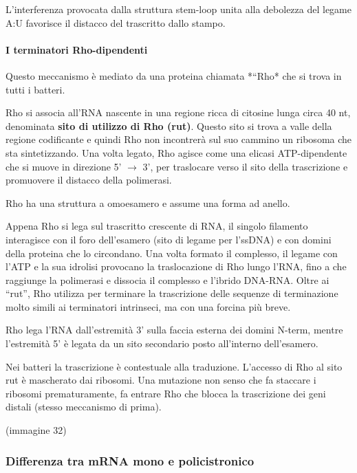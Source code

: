 \documentclass[]{article}
\begin{document}
L'interferenza provocata dalla struttura stem-loop unita alla debolezza
del legame A:U favorisce il distacco del trascritto dallo stampo.

\paragraph{I terminatori
Rho-dipendenti}\label{i-terminatori-rho-dipendenti}

Questo meccanismo è mediato da una proteina chiamata *``Rho* che si
trova in tutti i batteri.

Rho si associa all'RNA nascente in una regione ricca di citosine lunga
circa 40 nt, denominata \textbf{sito di utilizzo di Rho (rut)}. Questo
sito si trova a valle della regione codificante e quindi Rho non
incontrerà sul suo cammino un ribosoma che sta sintetizzando. Una volta
legato, Rho agisce come una elicasi ATP-dipendente che si muove in
direzione 5' $\rightarrow$ 3', per traslocare verso il sito della
trascrizione e promuovere il distacco della polimerasi.

Rho ha una struttura a omoesamero e assume una forma ad anello.

Appena Rho si lega sul trascritto crescente di RNA, il singolo filamento
interagisce con il foro dell'esamero (sito di legame per l'ssDNA) e con
domini della proteina che lo circondano. Una volta formato il complesso,
il legame con l'ATP e la sua idrolisi provocano la traslocazione di Rho
lungo l'RNA, fino a che raggiunge la polimerasi e dissocia il complesso
e l'ibrido DNA-RNA. Oltre ai ``rut'', Rho utilizza per terminare la
trascrizione delle sequenze di terminazione molto simili ai terminatori
intrinseci, ma con una forcina più breve.

Rho lega l'RNA dall'estremità 3' sulla faccia esterna dei domini N-term,
mentre l'estremità 5' è legata da un sito secondario posto all'interno
dell'esamero.

Nei batteri la trascrizione è contestuale alla traduzione. L'accesso di
Rho al sito rut è mascherato dai ribosomi. Una mutazione non senso che
fa staccare i ribosomi prematuramente, fa entrare Rho che blocca la
trascrizione dei geni distali (stesso meccanismo di prima).

(immagine 32)

\subsubsection{Differenza tra mRNA mono e
policistronico}\label{differenza-tra-mrna-mono-e-policistronico}
\end{document}
